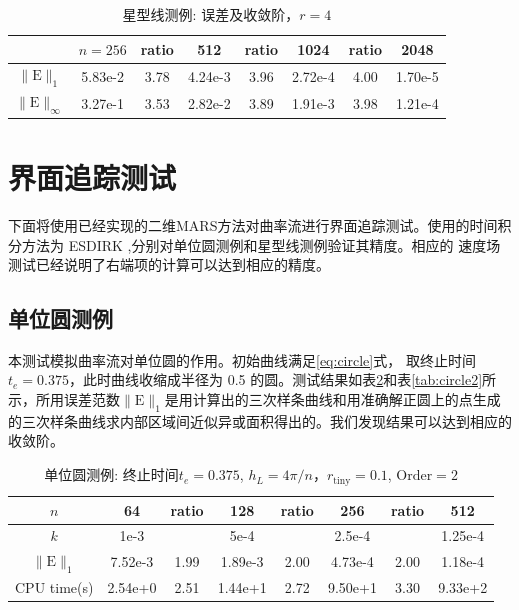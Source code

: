 \documentclass[a4paper,twoside]{ctexart}
\begin{document}
  \begin{table}[htbp]
    \centering\begin{tabular}{c|ccccccc}
        \hline
         &$n=256$&ratio&512&ratio&1024&ratio&2048\\
        \hline
        $\|\mathrm{E}\|_1$&5.83e-2&3.78&4.24e-3&3.96&2.72e-4&4.00&1.70e-5\\
        \hline
        $\|\mathrm{E}\|_{\infty}$&3.27e-1&3.53&2.82e-2&3.89&1.91e-3&3.98&1.21e-4\\
        \hline
    \end{tabular}
    \caption{星型线测例: 误差及收敛阶，$r = 4$}
    \label{tab:starv2}
  \end{table}
  \newpage
\section{界面追踪测试}
下面将使用已经实现的二维MARS方法对曲率流进行界面追踪测试。使用的时间积
分方法为 ESDIRK ,分别对单位圆测例和星型线测例验证其精度。相应的
速度场测试已经说明了右端项的计算可以达到相应的精度。
\subsection{单位圆测例}

本测试模拟曲率流对单位圆的作用。初始曲线满足\eqref{eq:circle}式，
取终止时间$t_e=0.375$，此时曲线收缩成半径为 0.5 的圆。测试结果如表\ref{tab:circle1}和表\ref{tab:circle2}所示，所用误差范数$\|\mathrm{E}\|_1$是用计算出的三次样条曲线和用准确解正圆上的点生成的三次样条曲线求内部区域间近似异或面积得出的。我们发现结果可以达到相应的收敛阶。

\begin{table}[htbp]
    \centering\begin{tabular}{c|ccccccc}
        \hline
         $n$&64&ratio&128&ratio&256&ratio&512\\
                \hline
         $k$&1e-3&&5e-4&&2.5e-4&&1.25e-4\\
        \hline
        $\|\mathrm{E}\|_1$&7.52e-3&1.99&1.89e-3&2.00&4.73e-4&2.00&1.18e-4\\
        \hline
        CPU time(s)&2.54e+0&2.51&1.44e+1&2.72&9.50e+1&3.30&9.33e+2\\
        \hline
      \end{tabular}
    \caption{单位圆测例: 终止时间$t_e = 0.375$, $h_L=4\pi/n$，$r_{\text{tiny}}=0.1$,
      $\text{Order} = 2$}
    \label{tab:circle1}
  \end{table}
\end{document}
